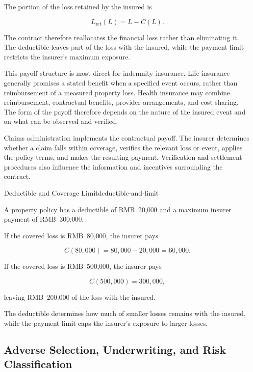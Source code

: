 The portion of the loss retained by the insured is

\begin{equation}
L_{\mathrm{ret}}(L)=L-C(L).
\label{eq:ch15-retained-loss}
\end{equation}

The contract therefore reallocates the financial loss rather than eliminating it. The deductible leaves part of the loss with the insured, while the payment limit restricts the insurer's maximum exposure.

This payoff structure is most direct for indemnity insurance. Life insurance generally promises a stated benefit when a specified event occurs, rather than reimbursement of a measured property loss. Health insurance may combine reimbursement, contractual benefits, provider arrangements, and cost sharing. The form of the payoff therefore depends on the nature of the insured event and on what can be observed and verified.

Claims administration implements the contractual payoff. The insurer determines whether a claim falls within coverage, verifies the relevant loss or event, applies the policy terms, and makes the resulting payment. Verification and settlement procedures also influence the information and incentives surrounding the contract.

\begin{example}{Deductible and Coverage Limit}{deductible-and-limit}

A property policy has a deductible of RMB~20,000 and a maximum insurer payment of RMB~300,000.

If the covered loss is RMB~80,000, the insurer pays

$$
C(80{,}000)=80{,}000-20{,}000=60{,}000.
$$

If the covered loss is RMB~500,000, the insurer pays

$$
C(500{,}000)=300{,}000,
$$

leaving RMB~200,000 of the loss with the insured.

The deductible determines how much of smaller losses remains with the insured, while the payment limit caps the insurer's exposure to larger losses.

\end{example}


\subsection[Adverse Selection, Underwriting, and Risk Classification]{Adverse Selection, Underwriting, and Risk \\Classification}


